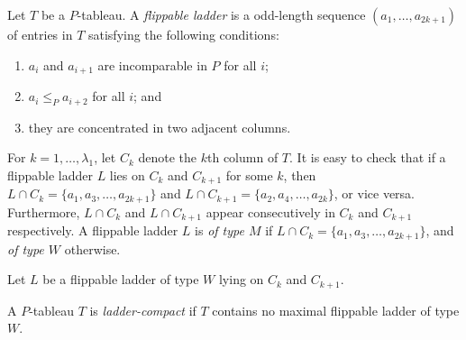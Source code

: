 \documentclass[11pt,reqno]{amsart}
\theoremstyle{definition}
\theoremstyle{remark}
\numberwithin{equation}{section}
\begin{document}
Let \( T \) be a \( P \)-tableau. A \emph{flippable ladder} is a odd-length sequence
\( (a_1,\dots,a_{2k+1}) \) of entries in \( T \) satisfying the following conditions:
\begin{enumerate}[label=(\roman*)]
  \item \( a_i \) and \( a_{i+1} \) are incomparable in \( P \) for all \( i \);
  \item \( a_i \le_P a_{i+2} \) for all \( i \); and
  \item they are concentrated in two adjacent columns.
\end{enumerate}
For \( k=1,\dots,\lambda_1 \), let \( C_k \) denote the \( k \)th column of \( T \).
It is easy to check that if a flippable ladder \( L \) lies on \( C_k \) and \( C_{k+1} \) for some
\( k \), then \( L\cap C_k = \{a_1,a_3,\dots,a_{2k+1}\} \) and \( L\cap C_{k+1} =
\{a_2,a_4,\dots,a_{2k}\} \), or vice versa. Furthermore, \( L\cap C_k \) and \( L\cap C_{k+1} \)
appear consecutively in \( C_k \) and \( C_{k+1} \) respectively.
A flippable ladder \( L \) is \emph{of type \( M \)} if \( L \cap C_k = \{a_1,a_3,\dots,a_{2k+1}\} \),
and \emph{of type \( W \)} otherwise.

Let \( L \) be a flippable ladder of type \( W \) lying on \( C_k \) and \( C_{k+1} \).



A \( P \)-tableau \( T \) is \emph{ladder-compact} if \( T \) contains no maximal flippable ladder
of type \( W \).
\end{document}
